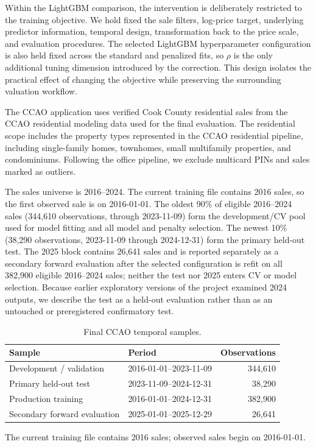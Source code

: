 \documentclass[10pt]{article}
\theoremstyle{definition}
\newcommand{\1}{\mathbf{1}}
\begin{document}
{{{Within the LightGBM comparison, the intervention is deliberately restricted to the training objective. We hold fixed the sale filters, log-price target, underlying predictor information, temporal design, transformation back to the price scale, and evaluation procedures. The selected LightGBM hyperparameter configuration is also held fixed across the standard and penalized fits, so $\rho$ is the only additional tuning dimension introduced by the correction. This design isolates the practical effect of changing the objective while preserving the surrounding valuation workflow.}

The CCAO application uses verified Cook County residential sales {from the CCAO residential modeling data used for the final evaluation. }
{The residential scope includes the property types represented in the CCAO residential pipeline, including single-family homes, townhomes, small multifamily properties, and condominiums.}
Following the office pipeline, we exclude multicard PINs and sales marked as outliers.


{The sales universe is 2016--2024. The current training file contains 2016 sales, so the first observed sale is on 2016-01-01. The oldest 90\% of eligible 2016--2024 sales (344,610 observations, through 2023-11-09) form the development/CV pool used for model fitting and all model and penalty selection. The newest 10\% (38,290 observations, 2023-11-09 through 2024-12-31) form the primary held-out test. The 2025 block contains 26,641 sales and is reported separately as a secondary forward evaluation after the selected configuration is refit on all 382,900 eligible 2016--2024 sales; neither the test nor 2025 enters CV or model selection. Because earlier exploratory versions of the project examined 2024 outputs, we describe the test as a held-out evaluation rather than as an untouched or preregistered confirmatory test.}

\begin{table}[!ht]
\centering
\caption{Final CCAO temporal samples.}
\label{tab:ccao_samples}
\begin{tabular}{llr}
\toprule
Sample & Period & Observations \\
\midrule
Development / validation & 2016-01-01--2023-11-09 & 344,610 \\
Primary held-out test & 2023-11-09--2024-12-31 & 38,290 \\
Production training & 2016-01-01--2024-12-31 & 382,900 \\
Secondary forward evaluation & 2025-01-01--2025-12-29 & 26,641 \\
\bottomrule
\end{tabular}
\end{table}
{\footnotesize The current training file contains 2016 sales; observed sales begin on 2016-01-01.}

}}
\end{document}
